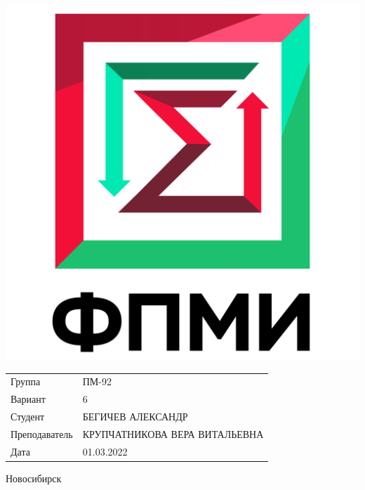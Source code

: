 \documentclass[12pt,a4paper]{article}
\begin{document}
\begin{center}
\begin{minipage}{0.3 \textwidth}
	\includegraphics[scale=0.18]{pic/fami_emblem}
\end{minipage}%
\hfill
\begin{minipage}{0.7 \textwidth}
	\begin{flushleft}
	
	\renewcommand{\arraystretch}{1.4}
	\begin{tabular}{ll}
		Группа			& ПМ-92 \\
		Вариант			& 6 \\

		Студент			& \uppercase{Бегичев Александр} \\
	
		Преподаватель	& \uppercase{Крупчатникова Вера Витальевна} \\
	
		Дата			& 01.03.2022
	\end{tabular}
	\renewcommand{\arraystretch}{1.0}
	
	\end{flushleft}
\end{minipage}%

\begin{Large}

\vspace{30mm}

Новосибирск \\

\end{Large}
\end{center}

\newpage
\end{document}
